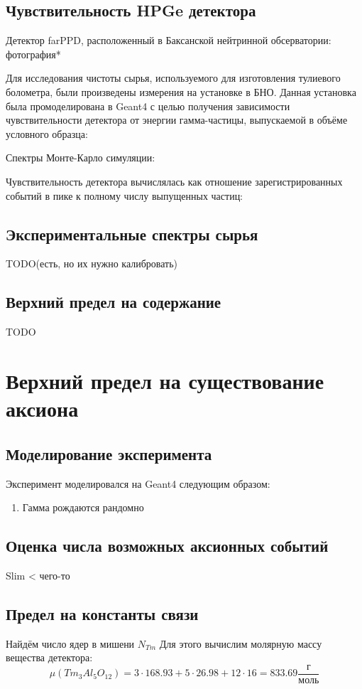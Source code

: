 \documentclass[a4paper,article,14pt]{extarticle}
\begin{document}
\subsection{Чувствительность HPGe детектора}
Детектор farPPD, расположенный в Баксанской нейтринной обсерватории:
фотография*

Для исследования чистоты сырья, используемого для изготовления тулиевого болометра, были произведены измерения на установке в БНО. Данная установка была промоделирована в Geant4 с целью получения зависимости чувствительности детектора от энергии гамма-частицы, выпускаемой в объёме условного образца:

Спектры Монте-Карло симуляции:

Чувствительность детектора вычислялась как отношение зарегистрированных событий в пике к полному числу выпущенных частиц:


\subsection{Экспериментальные спектры сырья}
    
    TODO(есть, но их нужно калибровать)
    
\subsection{Верхний предел на содержание}
     TODO

\section{Верхний предел на существование аксиона}

\subsection{Моделирование эксперимента}
Эксперимент моделировался на Geant4 следующим образом:
\begin{enumerate}
    \item Гамма рождаются рандомно
\end{enumerate}
\subsection{Оценка числа возможных аксионных событий}
Slim < чего-то

\subsection{Предел на константы связи}
Найдём число ядер в мишени ${N_{Tm}}$ Для этого вычислим молярную массу вещества детектора:
\begin{equation}
    \mu \left( {T{m_3}A{l_5}{O_{12}}} \right) = 3 \cdot 168.93 + 5 \cdot 26.98 + 12 \cdot 16 = 833.69\frac{\text{г}}{{\text{моль}}}
\end{equation}
\end{document}
